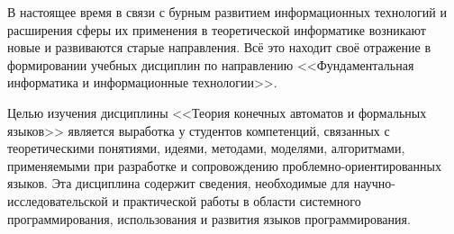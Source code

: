 \large

\label{Intro}
В настоящее время в связи с бурным развитием информационных технологий и расширения сферы их применения в теоретической информатике возникают новые и развиваются старые направления. Всё это находит своё отражение в формировании учебных дисциплин по направлению <<Фундаментальная информатика и информационные технологии>>. 

Целью изучения дисциплины <<Теория конечных автоматов и формальных языков>> является выработка у студентов компетенций, связанных с теоретическими понятиями, идеями, методами, моделями, алгоритмами, применяемыми при разработке и сопровождению проблемно-ориентированных языков. Эта дисциплина содержит сведения, необходимые для научно-исследовательской и практической работы в области системного программирования, использования и развития языков программирования.

